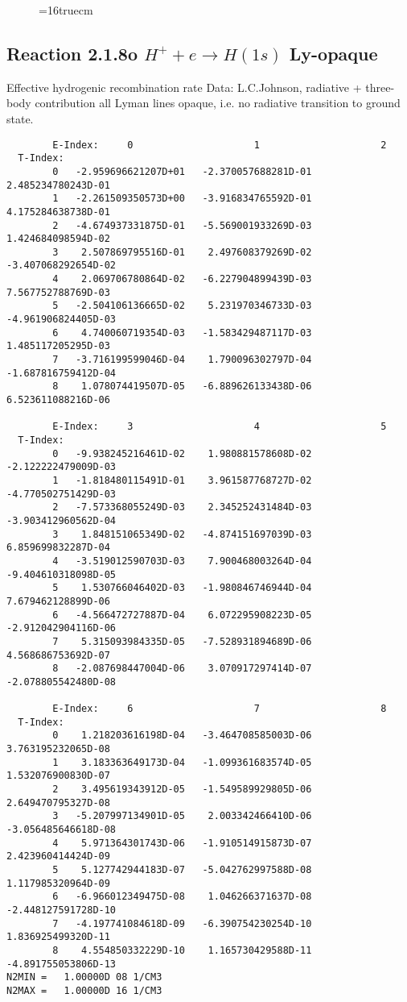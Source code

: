 \documentclass[12pt,dvipdfmx]{article}
\begin{document}
\begin{figure} \label{2.1.8}
\epsfxsize=16truecm
\end{figure}
\newpage

\subsection{
  Reaction 2.1.8o $ H^+ + e \rightarrow H(1s) $ Ly-opaque
}

   Effective hydrogenic recombination rate
   Data: L.C.Johnson, radiative + three-body contribution
   all Lyman lines opaque, i.e. no radiative transition to ground state.


\begin{small}\begin{verbatim}
        E-Index:     0                     1                     2
  T-Index:
        0   -2.959696621207D+01   -2.370057688281D-01    2.485234780243D-01
        1   -2.261509350573D+00   -3.916834765592D-01    4.175284638738D-01
        2   -4.674937331875D-01   -5.569001933269D-03    1.424684098594D-02
        3    2.507869795516D-01    2.497608379269D-02   -3.407068292654D-02
        4    2.069706780864D-02   -6.227904899439D-03    7.567752788769D-03
        5   -2.504106136665D-02    5.231970346733D-03   -4.961906824405D-03
        6    4.740060719354D-03   -1.583429487117D-03    1.485117205295D-03
        7   -3.716199599046D-04    1.790096302797D-04   -1.687816759412D-04
        8    1.078074419507D-05   -6.889626133438D-06    6.523611088216D-06

        E-Index:     3                     4                     5
  T-Index:
        0   -9.938245216461D-02    1.980881578608D-02   -2.122222479009D-03
        1   -1.818480115491D-01    3.961587768727D-02   -4.770502751429D-03
        2   -7.573368055249D-03    2.345252431484D-03   -3.903412960562D-04
        3    1.848151065349D-02   -4.874151697039D-03    6.859699832287D-04
        4   -3.519012590703D-03    7.900468003264D-04   -9.404610318098D-05
        5    1.530766046402D-03   -1.980846746944D-04    7.679462128899D-06
        6   -4.566472727887D-04    6.072295908223D-05   -2.912042904116D-06
        7    5.315093984335D-05   -7.528931894689D-06    4.568686753692D-07
        8   -2.087698447004D-06    3.070917297414D-07   -2.078805542480D-08

        E-Index:     6                     7                     8
  T-Index:
        0    1.218203616198D-04   -3.464708585003D-06    3.763195232065D-08
        1    3.183363649173D-04   -1.099361683574D-05    1.532076900830D-07
        2    3.495619343912D-05   -1.549589929805D-06    2.649470795327D-08
        3   -5.207997134901D-05    2.003342466410D-06   -3.056485646618D-08
        4    5.971364301743D-06   -1.910514915873D-07    2.423960414424D-09
        5    5.127742944183D-07   -5.042762997588D-08    1.117985320964D-09
        6   -6.966012349475D-08    1.046266371637D-08   -2.448127591728D-10
        7   -4.197741084618D-09   -6.390754230254D-10    1.836925499320D-11
        8    4.554850332229D-10    1.165730429588D-11   -4.891755053806D-13
N2MIN =   1.00000D 08 1/CM3
N2MAX =   1.00000D 16 1/CM3


\end{verbatim}
\end{small}
\end{document}
